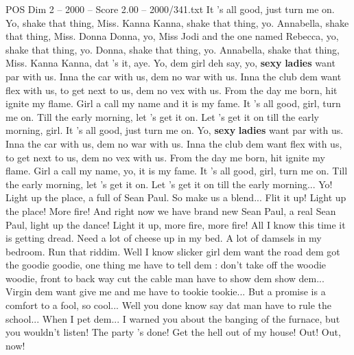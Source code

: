 \begin{textsample}{POS Dim 2 – 2000 – Score 2.00 – 2000/341.txt}
It 's all good, just turn me on.
Yo, shake that thing, Miss.
Kanna Kanna, shake that thing, yo.
Annabella, shake that thing, Miss.
Donna Donna, yo, Miss Jodi and the one named Rebecca, yo, shake that thing, yo.
Donna, shake that thing, yo.
Annabella, shake that thing, Miss.
Kanna Kanna, dat 's it, aye.
Yo, dem girl deh say, yo, \textbf{sexy} \textbf{ladies} want par with us.
Inna the car with us, dem no war with us.
Inna the club dem want flex with us, to get next to us, dem no vex with us.
From the day me born, hit ignite my flame.
Girl a call my name and it is my fame.
It 's all good, girl, turn me on.
Till the early morning, let 's get it on.
Let 's get it on till the early morning, girl.
It 's all good, just turn me on.
Yo, \textbf{sexy} \textbf{ladies} want par with us.
Inna the car with us, dem no war with us.
Inna the club dem want flex with us, to get next to us, dem no vex with us.
From the day me born, hit ignite my flame.
Girl a call my name, yo, it is my fame.
It 's all good, girl, turn me on.
Till the early morning, let 's get it on.
Let 's get it on till the early morning...
Yo!
Light up the place, a full of Sean Paul.
So make us a blend...
Flit it up!
Light up the place!
More fire!
And right now we have brand new Sean Paul, a real Sean Paul, light up the dance!
Light it up, more fire, more fire!
All I know this time it is getting dread.
Need a lot of cheese up in my bed.
A lot of damsels in my bedroom.
Run that riddim.
Well I know slicker girl dem want the road dem got the goodie goodie, one thing me have to tell dem : don't take off the woodie woodie, front to back way cut the cable man have to show dem show dem...
Virgin dem want give me and me have to tookie tookie...
But a promise is a comfort to a fool, so cool...
Well you done know say dat man have to rule the school...
When I pet dem...
I warned you about the banging of the furnace, but you wouldn't listen!
The party 's done!
Get the hell out of my house!
Out!
Out, now!

\end{textsample}
